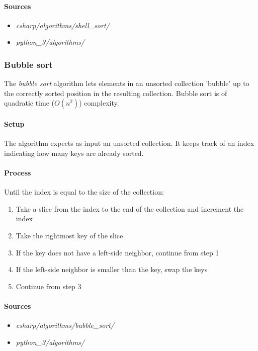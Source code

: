\documentclass{article}
\begin{document}
{\begin{samepage}
  \paragraph{Sources}
  \begin{itemize}
  \item{{\em csharp/algorithms/shell\_sort/}}
  \item{{\em python\_3/algorithms/}}
  \end{itemize}
\end{samepage}


\subsubsection{Bubble sort}
The {\em bubble sort} algorithm lets elements in an unsorted collection 'bubble' up to the correctly sorted position
in the resulting collection. Bubble sort is of quadratic time (\(O(n^2)\)) complexity.

\paragraph{Setup}
The algorithm expects as input an unsorted collection. It keeps track of an index indicating how many keys are
already sorted.

\paragraph{Process}
Until the index is equal to the size of the collection:
\begin{enumerate}
\item{Take a slice from the index to the end of the collection and increment the index}
\item{Take the rightmost key of the slice}
\item{If the key does not have a left-side neighbor, continue from step 1}
\item{If the left-side neighbor is smaller than the key, swap the keys}
\item{Continue from step 3}
\end{enumerate}

\begin{samepage}
  \paragraph{Sources}
  \begin{itemize}
  \item{{\em csharp/algorithms/bubble\_sort/}}
  \item{{\em python\_3/algorithms/}}
  \end{itemize}
\end{samepage}


}
\end{document}
